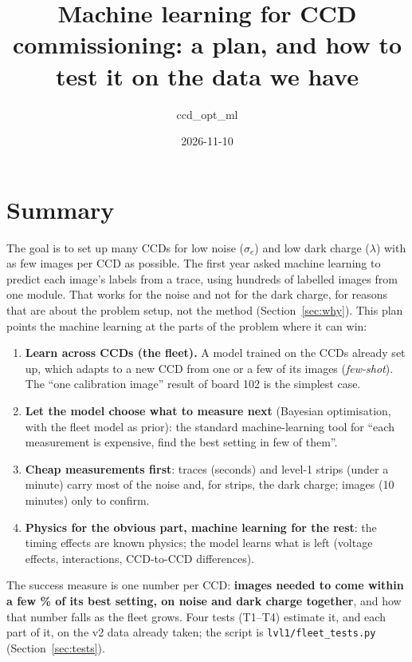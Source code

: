 \documentclass[11pt]{article}
\title{Machine learning for CCD commissioning: a plan, and how to test it on the data we have}
\author{ccd\_opt\_ml}
\date{2026-11-10}
\newcommand{\se}{\sigma_e}
\begin{document}
\maketitle

\section*{Summary}
The goal is to set up many CCDs for low noise ($\se$) and low dark charge ($\lambda$) with as few images per CCD as
possible. The first year asked machine learning to predict each image's labels from a trace, using hundreds of labelled
images from one module. That works for the noise and not for the dark charge, for reasons that are about the problem setup,
not the method (Section~\ref{sec:why}). This plan points the machine learning at the parts of the problem where it can
win:
\begin{enumerate}
\item \textbf{Learn across CCDs (the fleet).} A model trained on the CCDs already set up, which adapts to a new CCD from
  one or a few of its images (\emph{few-shot}). The ``one calibration image'' result of board 102 is the simplest case.
\item \textbf{Let the model choose what to measure next} (Bayesian optimisation, with the fleet model as prior): the
  standard machine-learning tool for ``each measurement is expensive, find the best setting in few of them''.
\item \textbf{Cheap measurements first}: traces (seconds) and level-1 strips (under a minute) carry most of the noise
  and, for strips, the dark charge; images (10 minutes) only to confirm.
\item \textbf{Physics for the obvious part, machine learning for the rest}: the timing effects are known physics; the
  model learns what is left (voltage effects, interactions, CCD-to-CCD differences).
\end{enumerate}
The success measure is one number per CCD: \textbf{images needed to come within a few \% of its best setting, on noise and
dark charge together}, and how that number falls as the fleet grows. Four tests (T1--T4) estimate it, and each part of
it, on the v2 data already taken; the script is \texttt{lvl1/fleet\_tests.py} (Section~\ref{sec:tests}).
\end{document}
